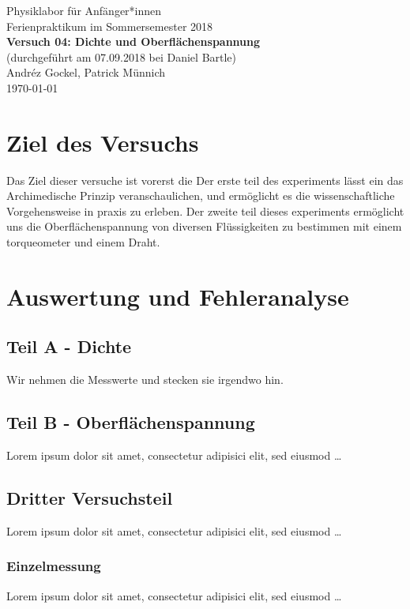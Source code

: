\documentclass[11pt,a4paper]{article}
\begin{document}
{
\centering 
\large 
Physiklabor für Anfänger*innen \\
Ferienpraktikum im Sommersemester 2018 \\[4mm]
\textbf{\LARGE 
Versuch 04: Dichte und Oberflächenspannung
} \\[3mm]
(durchgeführt am 07.09.2018 bei Daniel Bartle) \\
Andréz Gockel, Patrick Münnich\\
\today \\[10mm]
}

\section{Ziel des Versuchs}

Das Ziel dieser versuche ist vorerst die 
Der erste teil des experiments lässt ein das Archimedische Prinzip veranschaulichen, und ermöglicht es die wissenschaftliche Vorgehensweise in praxis zu erleben. 
Der zweite teil dieses experiments ermöglicht uns die Oberflächenspannung von diversen Flüssigkeiten zu bestimmen mit einem torqueometer und einem Draht.


\section{Auswertung und Fehleranalyse}


\subsection{Teil A - Dichte}
Wir nehmen die Messwerte und stecken sie irgendwo hin. 

\subsection{Teil B - Oberflächenspannung}
Lorem ipsum dolor sit amet, consectetur adipisici elit, sed eiusmod \dots

\subsection{Dritter Versuchsteil}
Lorem ipsum dolor sit amet, consectetur adipisici elit, sed eiusmod \dots

\subsubsection{Einzelmessung}
Lorem ipsum dolor sit amet, consectetur adipisici elit, sed eiusmod \dots
\end{document}
